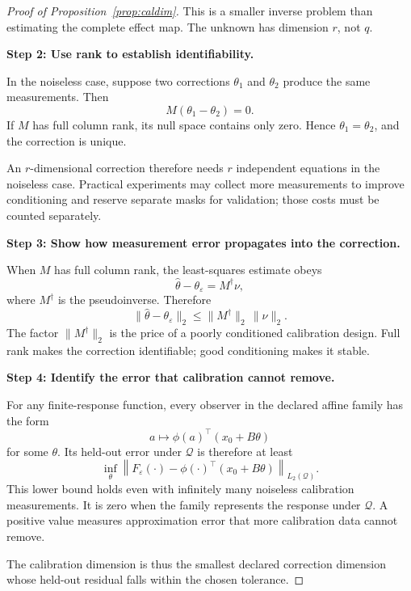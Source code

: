 \documentclass[sigconf,10pt,nonacm,balance=false]{acmart}
\newcommand{\eps}{\varepsilon}
\begin{document}
\begin{proof}[Proof of Proposition~\ref{prop:caldim}]
This is a smaller inverse problem than estimating the complete effect map. The unknown has dimension $r$, not $q$.

\noindent\textbf{Step 2: Use rank to establish identifiability.}\par
In the noiseless case, suppose two corrections $\theta_1$ and $\theta_2$ produce the same measurements. Then
\[
    M(\theta_1-\theta_2)=0.
\]
If $M$ has full column rank, its null space contains only zero. Hence $\theta_1=\theta_2$, and the correction is unique.

An $r$-dimensional correction therefore needs $r$ independent equations in the noiseless case. Practical experiments may collect more measurements to improve conditioning and reserve separate masks for validation; those costs must be counted separately.

\noindent\textbf{Step 3: Show how measurement error propagates into the correction.}\par
When $M$ has full column rank, the least-squares estimate obeys
\begin{equation}
    \widehat\theta-\theta_\eps=M^\dagger\nu,
\end{equation}
where $M^\dagger$ is the pseudoinverse. Therefore
\begin{equation}
    \|\widehat\theta-\theta_\eps\|_2
    \leq
    \|M^\dagger\|_2\,\|\nu\|_2.
\end{equation}
The factor $\|M^\dagger\|_2$ is the price of a poorly conditioned calibration design. Full rank makes the correction identifiable; good conditioning makes it stable.

\noindent\textbf{Step 4: Identify the error that calibration cannot remove.}\par
For any finite-response function, every observer in the declared affine family has the form
\[
    a\longmapsto\phi(a)^\top(x_0+B\theta)
\]
for some $\theta$. Its held-out error under $\mathcal Q$ is therefore at least
\begin{equation}
    \inf_\theta
    \left\|
        F_\eps(\cdot)
        -
        \phi(\cdot)^\top(x_0+B\theta)
    \right\|_{L_2(\mathcal Q)}.
\end{equation}
This lower bound holds even with infinitely many noiseless calibration measurements. It is zero when the family represents the response under $\mathcal Q$. A positive value measures approximation error that more calibration data cannot remove.

The calibration dimension is thus the smallest declared correction dimension whose held-out residual falls within the chosen tolerance.
\end{proof}
\end{document}
